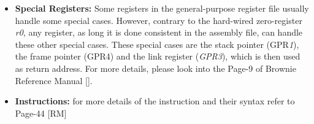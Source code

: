 \documentclass[
]{article}
\begin{document}
\begin{itemize}
\item
  \textbf{Special Registers:} Some registers in the general-purpose
  register file usually handle some special cases. However, contrary to
  the hard-wired zero-register \emph{r0}, any register, as long it is
  done consistent in the assembly file, can handle these other special
  cases. These special cases are the stack pointer (GPR\emph{1}), the
  frame pointer (GPR4) and the link register (\emph{GPR3}), which is
  then used as return address. For more details, please look into the
  Page-9 of Brownie Reference Manual {[}{]}.
\item
  \textbf{Instructions:} for more details of the instruction and their
  syntax refer to Page-44 {[}RM{]}
\end{itemize}
\end{document}
